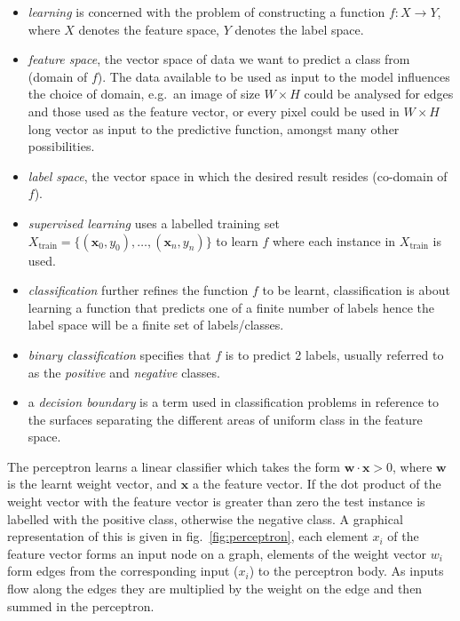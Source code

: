 \documentclass[A4paper,draft]{scrreprt}
\providecommand{\tightlist}{%
  \setlength{\itemsep}{0pt}\setlength{\parskip}{0pt}}
\begin{document}
\begin{itemize}
\tightlist
\item
  \emph{learning} is concerned with the problem of constructing a
  function \(f : X  \rightarrow Y\), where \(X\) denotes the feature
  space, \(Y\) denotes the label space.
\item
  \emph{feature space}, the vector space of data we want to predict a
  class from (domain of \(f\)). The data available to be used as input
  to the model influences the choice of domain, e.g.~an image of size
  \(W \times H\) could be analysed for edges and those used as the
  feature vector, or every pixel could be used in \(W \times H\) long
  vector as input to the predictive function, amongst many other
  possibilities.
\item
  \emph{label space}, the vector space in which the desired result
  resides (co-domain of \(f\)).
\item
  \emph{supervised learning} uses a labelled training set
  \(X_{\text{train}} =  \{ (\bm{x}_0, y_0), \ldots, (\bm{x}_n, y_n) \}\)
  to learn \(f\) where each instance in \(X_{\text{train}}\) is used.
\item
  \emph{classification} further refines the function \(f\) to be learnt,
  classification is about learning a function that predicts one of a
  finite number of labels hence the label space will be a finite set of
  labels/classes.
\item
  \emph{binary classification} specifies that \(f\) is to predict 2
  labels, usually referred to as the \emph{positive} and \emph{negative}
  classes.
\item
  a \emph{decision boundary} is a term used in classification problems
  in reference to the surfaces separating the different areas of uniform
  class in the feature space.
\end{itemize}

The perceptron learns a linear classifier which takes the form
\(\bm{w} \cdot \bm{x} > 0\), where \(\bm{w}\) is the learnt weight
vector, and \(\bm{x}\) a the feature vector. If the dot product of the
weight vector with the feature vector is greater than zero the test
instance is labelled with the positive class, otherwise the negative
class. A graphical representation of this is given in
fig.~\ref{fig:perceptron}, each element \(x_i\) of the feature vector
forms an input node on a graph, elements of the weight vector \(w_i\)
form edges from the corresponding input (\(x_i\)) to the perceptron
body. As inputs flow along the edges they are multiplied by the weight
on the edge and then summed in the perceptron.
\end{document}
